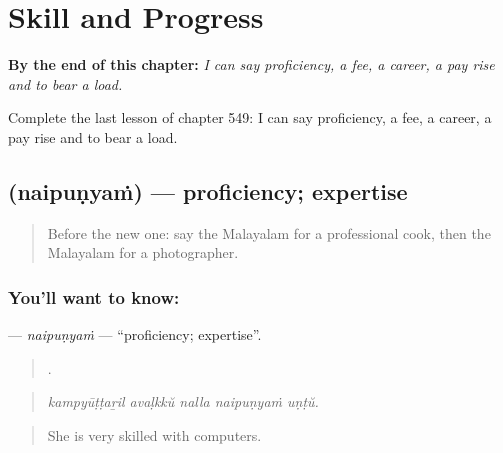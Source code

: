 
\chapter{Skill and Progress}
\label{ch:ml-skill-and-progress}

\begin{chapteropening}
\textbf{By the end of this chapter:} \emph{I can say proficiency, a fee, a career, a pay rise and to bear a load.}

Complete the last lesson of chapter 549: I can say proficiency, a fee, a career, a pay rise and to bear a load.
\end{chapteropening}

\section[\texorpdfstring{\ml{നൈപുണ്യം} (naipuṇyaṁ)}{നൈപുണ്യം (naipuṇyaṁ)}]{ (naipuṇyaṁ) — proficiency; expertise}

\label{lesson:ML-C549-naipunyam}



\begin{quote}
Before the new one: say the Malayalam for a professional cook, then the Malayalam for a photographer.
\end{quote}

\subsection*{You'll want to know: }
\textbf{} — \emph{naipuṇyaṁ} — \textquotedblleft{}proficiency; expertise\textquotedblright{}.

\begin{quote}
    .
\end{quote}

\begin{quote}
\emph{kampyūṭṭaṟil avaḷkkŭ nalla naipuṇyaṁ uṇṭŭ.}
\end{quote}

\begin{quote}
She is very skilled with computers.
\end{quote}

